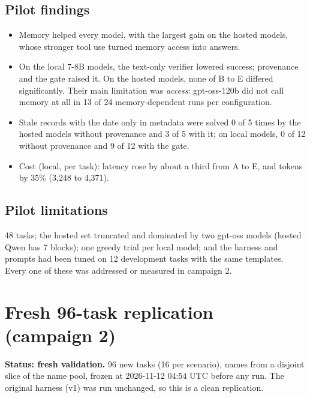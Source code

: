 \documentclass[10.5pt,a4paper,oneside]{report}
\begin{document}
\section{Pilot findings}
\begin{itemize}
\item Memory helped every model, with the largest gain on the hosted models, whose stronger tool use turned memory access into answers.
\item On the local 7-8B models, the text-only verifier lowered success; provenance and the gate raised it. On the hosted models, none of B to E differed significantly. Their main limitation was \emph{access}: gpt-oss-120b did not call memory at all in 13 of 24 memory-dependent runs per configuration.
\item Stale records with the date only in metadata were solved 0 of 5 times by the hosted models without provenance and 3 of 5 with it; on local models, 0 of 12 without provenance and 9 of 12 with the gate.
\item Cost (local, per task): latency rose by about a third from A to E, and tokens by 35\% (3,248 to 4,371).
\end{itemize}
\section{Pilot limitations}
48 tasks; the hosted set truncated and dominated by two gpt-oss models (hosted Qwen has 7 blocks); one greedy trial per local model; and the harness and prompts had been tuned on 12 development tasks with the same templates. Every one of these was addressed or measured in campaign 2.

\clearpage
\chapter{Fresh 96-task replication (campaign 2)}
\textbf{Status: fresh validation.} 96 new tasks (16 per scenario), names from a disjoint slice of the name pool, frozen at 2026-11-12 04:54 UTC before any run. The original harness (v1) was run unchanged, so this is a clean replication.
\end{document}
